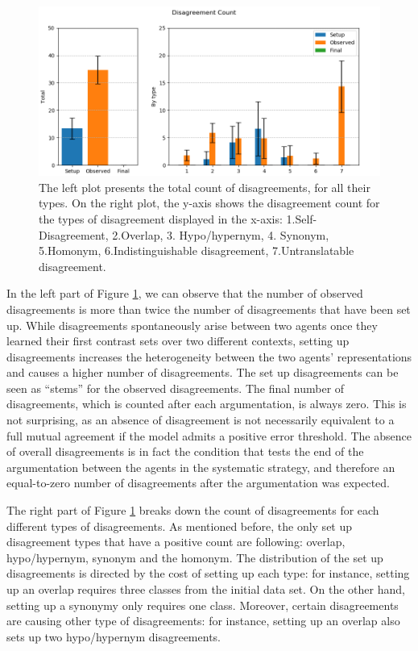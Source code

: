\begin{figure}
    \centering
    \includegraphics[width=\textwidth]{results/Figure_3_resized.png}
    \caption{The left plot presents the total count of disagreements, for all their types. On the right plot, the y-axis shows the  disagreement count for the types of disagreement displayed in the x-axis: 1.Self-Disagreement, 2.Overlap, 3. Hypo/hypernym, 4. Synonym, 5.Homonym, 6.Indistinguishable disagreement, 7.Untranslatable disagreement.}
    \label{fig:gen_count}
\end{figure}

In the left part of Figure \ref{fig:gen_count}, we can observe that the number of observed disagreements is more than twice the number of disagreements that have been set up. While disagreements spontaneously arise between two agents once they learned their first contrast sets over two different contexts, setting up disagreements increases the heterogeneity between the two agents' representations and causes a higher number of disagreements. The set up disagreements can be seen as ``stems'' for the observed disagreements. The final number of disagreements, which is counted after each argumentation, is always zero. This is not surprising, as an absence of disagreement is not necessarily equivalent to a full mutual agreement if the model admits a positive error threshold. The absence of overall disagreements is in fact the condition that tests the end of the argumentation between the agents in the systematic strategy, and therefore an equal-to-zero number of disagreements after the argumentation was expected.

The right part of Figure \ref{fig:gen_count} breaks down the count of disagreements for each different types of disagreements. As mentioned before, the only set up disagreement types that have a positive count are following: overlap,  hypo/hypernym,  synonym and the homonym. The distribution of the set up disagreements is directed by the cost of setting up each type: for instance, setting up an overlap requires three classes from the initial data set. On the other hand, setting up a synonymy only requires one class. Moreover, certain disagreements are causing other type of disagreements: for instance, setting up an overlap also sets up two hypo/hypernym disagreements.

